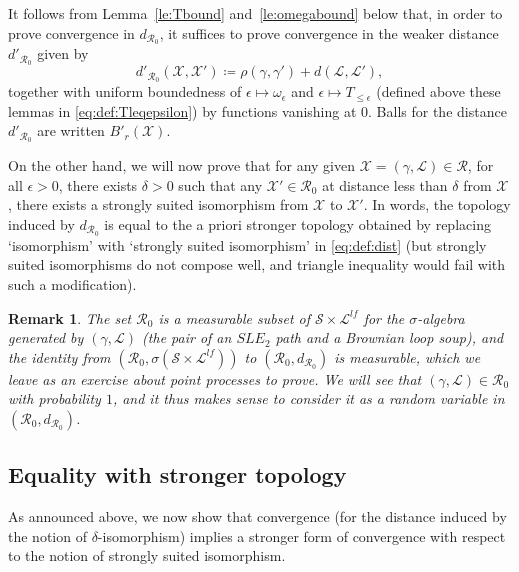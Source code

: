 \documentclass[11pt]{article}
\newtheorem{remark}[theorem]{Remark}
\def\Conf{{\mathscr{R}}}
\begin{document}
It follows from Lemma~\ref{le:Tbound} and~\ref{le:omegabound} below that, in order to prove convergence in $d_{\Conf_0}$, it suffices to prove convergence in the weaker distance $d'_{\Conf_0}$ given by
\begin{equation}
\label{eq:defdprime}
d'_{\Conf_0}(\mathcal{X},\mathcal{X}' )\coloneqq  \rho(\gamma,\gamma')+
d( \mathcal{L},\mathcal{L}'  ),
\end{equation}
together with uniform boundedness of $\epsilon\mapsto \omega_\epsilon$ and $\epsilon\mapsto T_{\leq\epsilon}$ (defined above these lemmas in \eqref{eq:def:Tleqepsilon}) by functions vanishing at $0$. Balls for the distance $d'_{\Conf_0}$ are written $B'_r(\mathcal{X})$.

On the other hand, we will now prove that for any given $\mathcal{X}=(\gamma,\mathcal{L})\in \mathcal{R}$, %
for all $\epsilon>0$, there exists $\delta>0$ such that any $\mathcal{X}'\in \mathcal{R}_0$ at distance less than $\delta$ from $\mathcal{X}$, there exists a strongly suited isomorphism from $\mathcal{X}$ to $\mathcal{X}'$. In words, the topology induced by $d_{\Conf_0}$ is equal to the a priori stronger topology obtained by replacing `isomorphism' with `strongly suited isomorphism' in \eqref{eq:def:dist} (but strongly suited isomorphisms do not compose well, and triangle inequality would fail with such a modification).
\begin{remark}
  The set $\Conf_0$ is a measurable subset of $\mathscr{S}\times \mathscr{L}^{lf}$ for the $\sigma$-algebra generated by $(\gamma,\mathcal{L})$ (the pair of an $SLE_2$ path and a Brownian loop soup), and the identity from $(\Conf_0,\sigma(\mathscr{S}\times \mathscr{L}^{lf}) )$ to $(\Conf_0, d_{\Conf_0})$ is measurable, which we leave as an exercise about point processes to prove. We will see that $(\gamma, \mathcal{L})\in \Conf_0$
  with probability $1$, and it thus makes sense to consider it as a random variable in $(\Conf_0, d_{\Conf_0})$. %
\end{remark}

\subsection{Equality with stronger topology}
\label{sub:strong}


As announced above, we now show that convergence (for the distance induced by the notion of $\delta$-isomorphism) implies a stronger form of convergence with respect to the notion of strongly suited isomorphism. 
\end{document}
